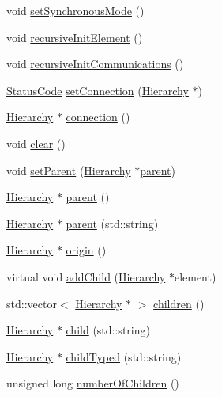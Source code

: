 \begin{DoxyCompactItemize}
\item 
void \hyperlink{classUsbFTMLInterface_a8aa032fbbaf9d0adbeea2d147d7c8a14}{set\+Synchronous\+Mode} ()
\item 
void \hyperlink{classElement_a3c0abcb36f8906688bb7e32608df7086}{recursive\+Init\+Element} ()
\item 
void \hyperlink{classElement_a82119ed37dff76508a2746a853ec35ba}{recursive\+Init\+Communications} ()
\item 
\hyperlink{classStatusCode}{Status\+Code} \hyperlink{classElement_ab476b4b1df5954141ceb14f072433b89}{set\+Connection} (\hyperlink{classHierarchy}{Hierarchy} $\ast$)
\item 
\hyperlink{classHierarchy}{Hierarchy} $\ast$ \hyperlink{classElement_af57444353c1ddf9fa0109801e97debf7}{connection} ()
\item 
void \hyperlink{classHierarchy_af4d43b0765b402670eed2d62c73405af}{clear} ()
\item 
void \hyperlink{classHierarchy_a585ad1aeec16077a0e532ab8b4fc557b}{set\+Parent} (\hyperlink{classHierarchy}{Hierarchy} $\ast$\hyperlink{classHierarchy_a1c7bec8257e717f9c1465e06ebf845fc}{parent})
\item 
\hyperlink{classHierarchy}{Hierarchy} $\ast$ \hyperlink{classHierarchy_a1c7bec8257e717f9c1465e06ebf845fc}{parent} ()
\item 
\hyperlink{classHierarchy}{Hierarchy} $\ast$ \hyperlink{classHierarchy_ad550588733bf75ac5c0fcfd7c8fd11a6}{parent} (std\+::string)
\item 
\hyperlink{classHierarchy}{Hierarchy} $\ast$ \hyperlink{classHierarchy_aee461dc930ce3871636ff87f075b1b83}{origin} ()
\item 
virtual void \hyperlink{classHierarchy_ad677774ff38fcb257c04a3a10d471fac}{add\+Child} (\hyperlink{classHierarchy}{Hierarchy} $\ast$element)
\item 
std\+::vector$<$ \hyperlink{classHierarchy}{Hierarchy} $\ast$ $>$ \hyperlink{classHierarchy_aa9a76f69e98e052ee1a6e32cea006288}{children} ()
\item 
\hyperlink{classHierarchy}{Hierarchy} $\ast$ \hyperlink{classHierarchy_a1e207f973c694b538bf90107b4868817}{child} (std\+::string)
\item 
\hyperlink{classHierarchy}{Hierarchy} $\ast$ \hyperlink{classHierarchy_a0c15a5276a3b80b4354d6bd8a01e0708}{child\+Typed} (std\+::string)
\item 
unsigned long \hyperlink{classHierarchy_ab16e84de65fd84e14001a6cf941c8be4}{number\+Of\+Children} ()
\item 

\end{DoxyCompactItemize}
